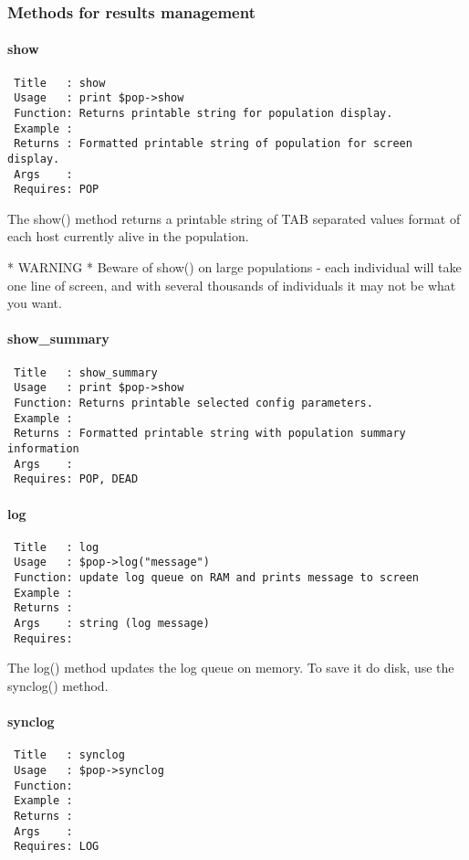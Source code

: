 \subsubsection*{Methods for results management\label{Methods_for_results_management}}
\paragraph*{show\label{show}}
\begin{verbatim}
 Title   : show
 Usage   : print $pop->show
 Function: Returns printable string for population display.
 Example :
 Returns : Formatted printable string of population for screen display.
 Args    :
 Requires: POP
\end{verbatim}


The show() method returns a printable string of TAB separated values
format of each host currently alive in the population.



* WARNING * Beware of show() on large populations - each individual
  will take one line of screen, and with several thousands of
  individuals it may not be what you want.

\paragraph*{show\_summary\label{show_summary}}
\begin{verbatim}
 Title   : show_summary
 Usage   : print $pop->show
 Function: Returns printable selected config parameters.
 Example : 
 Returns : Formatted printable string with population summary information
 Args    : 
 Requires: POP, DEAD
\end{verbatim}
\paragraph*{log\label{log}}
\begin{verbatim}
 Title   : log
 Usage   : $pop->log("message")
 Function: update log queue on RAM and prints message to screen
 Example : 
 Returns : 
 Args    : string (log message)
 Requires:
\end{verbatim}


The log() method updates the log queue on memory. To save it do disk, use
the synclog() method.

\paragraph*{synclog\label{synclog}}
\begin{verbatim}
 Title   : synclog
 Usage   : $pop->synclog
 Function: 
 Example : 
 Returns : 
 Args    : 
 Requires: LOG
\end{verbatim}


